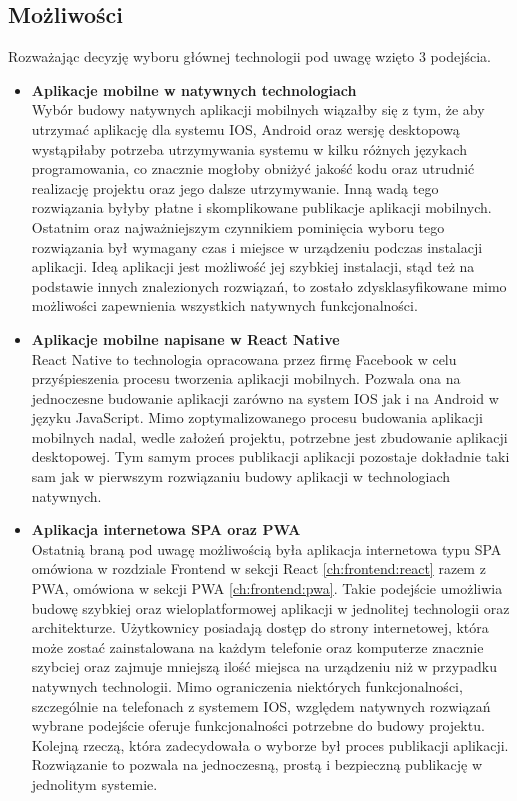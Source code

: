 \subsection{Możliwości}
Rozważając decyzję wyboru głównej technologii pod uwagę wzięto 3 podejścia.
\begin{itemize}
    \item \textbf {Aplikacje mobilne w natywnych technologiach} \\
        Wybór budowy natywnych aplikacji mobilnych wiązałby się z tym, że aby utrzymać aplikację dla systemu IOS, Android oraz wersję desktopową wystąpiłaby potrzeba utrzymywania systemu w kilku różnych językach programowania, co znacznie mogłoby obniżyć jakość kodu oraz utrudnić realizację projektu oraz jego dalsze utrzymywanie. Inną wadą tego rozwiązania byłyby płatne i skomplikowane publikacje aplikacji mobilnych. Ostatnim oraz najważniejszym czynnikiem pominięcia wyboru tego rozwiązania był wymagany czas i miejsce w urządzeniu podczas instalacji aplikacji. Ideą aplikacji jest możliwość jej szybkiej instalacji, stąd też na podstawie innych znalezionych rozwiązań, to zostało zdysklasyfikowane mimo możliwości zapewnienia wszystkich natywnych funkcjonalności.

    \item \textbf {Aplikacje mobilne napisane w React Native} \\
        React Native to technologia opracowana przez firmę Facebook w celu przyśpieszenia procesu tworzenia aplikacji mobilnych. Pozwala ona na jednoczesne budowanie aplikacji zarówno na system IOS jak i na Android w języku JavaScript. Mimo zoptymalizowanego procesu budowania aplikacji mobilnych nadal, wedle założeń projektu, potrzebne jest zbudowanie aplikacji desktopowej. Tym samym proces publikacji aplikacji pozostaje dokładnie taki sam jak w pierwszym rozwiązaniu budowy aplikacji w technologiach natywnych.

    \item \textbf {Aplikacja internetowa SPA oraz PWA} \\
        Ostatnią braną pod uwagę możliwością była aplikacja internetowa typu SPA omówiona w rozdziale Frontend w sekcji React \ref{ch:frontend:react} razem z PWA, omówiona w sekcji PWA \ref{ch:frontend:pwa}. Takie podejście umożliwia budowę szybkiej oraz wieloplatformowej aplikacji w jednolitej technologii oraz architekturze. Użytkownicy posiadają dostęp do strony internetowej, która może zostać zainstalowana na każdym telefonie oraz komputerze znacznie szybciej oraz zajmuje mniejszą ilość miejsca na urządzeniu niż w przypadku natywnych technologii. Mimo ograniczenia niektórych funkcjonalności, szczególnie na telefonach z systemem IOS, względem natywnych rozwiązań wybrane podejście oferuje funkcjonalności potrzebne do budowy projektu. Kolejną rzeczą, która zadecydowała o wyborze był proces publikacji aplikacji. Rozwiązanie to pozwala na jednoczesną, prostą i bezpieczną publikację w jednolitym systemie.
\end{itemize}

